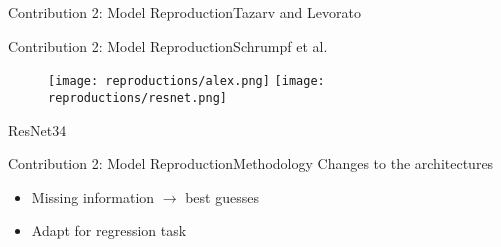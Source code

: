 \begin{frame}{Contribution 2: Model Reproduction}{Tazarv and Levorato}
    \begin{figure}
        
    \end{figure}
\end{frame}

\begin{frame}{Contribution 2: Model Reproduction}{Schrumpf et al.}
    \begin{figure}
        \texttt{[image: reproductions/alex.png]}
        \hfill
        \texttt{[image: reproductions/resnet.png]}
    \end{figure}
    ResNet34
\end{frame}

\begin{frame}{Contribution 2: Model Reproduction}{Methodology}
    Changes to the architectures
    \begin{itemize}
        \item Missing information $\to$ best guesses
        \item Adapt for regression task
    \end{itemize}
\end{frame}
